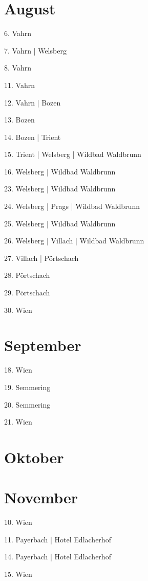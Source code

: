 \documentclass[twoside=false,titlepage=false,open=any, parskip=never, fontsize=10pt, headings=small, chapterprefix=false, appendixprefix=false, DIV=15]{scrbook}
\begin{document}
\begin{multicols}{3}
            \section*{August}
            6. Vahrn\par
            7. Vahrn | Welsberg\par
            8. Vahrn\par
            11. Vahrn\par
            12. Vahrn | Bozen\par
            13. Bozen\par
            14. Bozen | Trient\par
            15. Trient | Welsberg | Wildbad Waldbrunn\par
            16. Welsberg | Wildbad Waldbrunn\par
            23. Welsberg | Wildbad Waldbrunn\par
            24. Welsberg | Prags | Wildbad Waldbrunn\par
            25. Welsberg | Wildbad Waldbrunn\par
            26. Welsberg | Villach | Wildbad Waldbrunn\par
            27. Villach | Pörtschach\par
            28. Pörtschach\par
            29. Pörtschach\par
            30. Wien\par
            \section*{September}
            18. Wien\par
            19. Semmering\par
            20. Semmering\par
            21. Wien\par
            \section*{Oktober}
            \section*{November}
            10. Wien\par
            11. Payerbach | Hotel Edlacherhof\par
            14. Payerbach | Hotel Edlacherhof\par
            15. Wien\par

\end{multicols}
\end{document}
